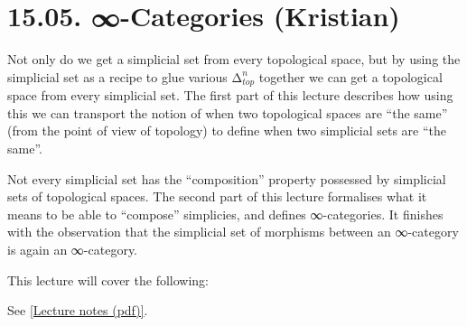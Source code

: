 \documentclass[a4paper]{amsart}
\numberwithin{figure}{section}
\theoremstyle{theorem}
\theoremstyle{definition}
\begin{document}
\section{15.05. ∞-Categories (Kristian)} \label{Sec:InfCat}

Not only do we get a simplicial set from every topological space, but by using the simplicial set as a recipe to glue various $∆_{top}^n$ together we can get a topological space from every simplicial set. The first part of this lecture describes how using this we can transport the notion of when two topological spaces are ``the same'' (from the point of view of topology) to define when two simplicial sets are ``the same''.

Not every simplicial set has the ``composition'' property possessed by simplicial sets of topological spaces. The second part of this lecture formalises what it means to be able to ``compose'' simplicies, and defines ∞-categories. It finishes with the observation that the simplicial set of morphisms between an ∞-category is again an ∞-category.

This lecture will cover the following: 

See \href{InfCat3IC.pdf}{[Lecture notes (pdf)]}. \\%
\\ 
\end{document}
